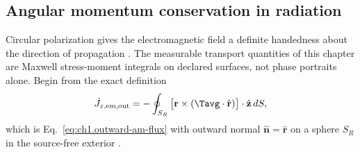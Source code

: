 \subsection{Angular momentum conservation in radiation}
\label{sec:ch01.6.1}

Circular polarization gives the electromagnetic field a definite handedness about the direction of propagation \cite{stratton1941,beth1936}. The measurable transport quantities of this chapter are Maxwell stress-moment integrals on declared surfaces, not phase portraits alone. Begin from the exact definition
\begin{equation}
\label{eq:ch1.ex61-flux-from-stress}
\dot J_{z,\mathrm{em,out}}
=-\oint_{S_R}\big[\mathbf{r}\times(\Tavg\cdot\hat{\mathbf{r}})\big]\cdot\hat{\mathbf{z}}\,dS,
\end{equation}
which is Eq.~\eqref{eq:ch1.outward-am-flux} with outward normal $\hat{\mathbf{n}}=\hat{\mathbf{r}}$ on a sphere $S_R$ in the source-free exterior \cite{stratton1941,beth1936}.

